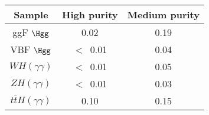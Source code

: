 \begin{tabular}{|c|c|c|}
\hline
Sample & High purity & Medium purity\\
\hline
ggF $\Hgg$                &  0.02  &  0.19 \\
VBF $\Hgg$                &$<$~0.01&  0.04 \\
$WH(\gamma\gamma)$        &$<$~0.01&  0.05 \\
$ZH(\gamma\gamma)$        &$<$~0.01&  0.03 \\
$t\bar{t}H(\gamma\gamma)$ &  0.10  &  0.15 \\
\hline
\end{tabular}
